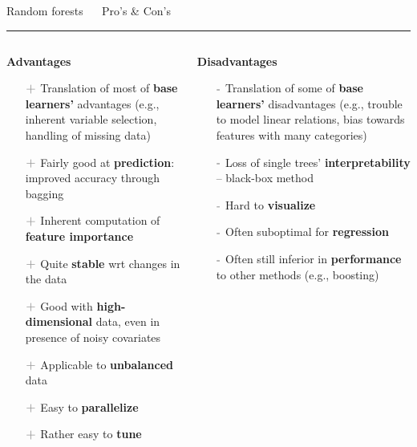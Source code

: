 \documentclass[11pt,compress,t,notes=noshow, xcolor=table]{beamer}
\begin{document}
\LARGE
\begin{frame}{\textcolor{gray!80}{Random forests} ~~ Pro's \& Con's}
\normalsize
\vspace{-0.5cm}
\noindent \textcolor{gray!80}{\rule{\textwidth}{1pt}}

\vspace{0.3cm}

\footnotesize

\begin{columns}[onlytextwidth]
  \begin{column}{0.5\textwidth}
    \textbf{\textcolor{gray!80}{Advantages}}
    \footnotesize
    \begin{itemize}
      \item[$\textbf{\textcolor{gray!80}{+}}$] Translation of most of 
      \textbf{base learners'} advantages (e.g., inherent variable selection, 
      handling of missing data)
      \item[$\textbf{\textcolor{gray!80}{+}}$] Fairly good at 
      \textbf{prediction}: improved accuracy through bagging
      \item[$\textbf{\textcolor{gray!80}{+}}$] Inherent computation of 
      \textbf{feature importance}
      \item[$\textbf{\textcolor{gray!80}{+}}$] Quite \textbf{stable} wrt changes 
      in the data
      \item[$\textbf{\textcolor{gray!80}{+}}$] Good with 
      \textbf{high-dimensional} data, even in presence of noisy covariates
      \item[$\textbf{\textcolor{gray!80}{+}}$] Applicable to \textbf{unbalanced} 
      data
      \item[$\textbf{\textcolor{gray!80}{+}}$] Easy to \textbf{parallelize}
      \item[$\textbf{\textcolor{gray!80}{+}}$] Rather easy to \textbf{tune}
    \end{itemize}
  \end{column}
  \begin{column}{0.5\textwidth}
    \textbf{\textcolor{gray!80}{Disadvantages}}
    \footnotesize
    \begin{itemize}
      \item[$\textbf{\textcolor{gray!80}{-}}$] Translation of some of 
      \textbf{base learners'} disadvantages (e.g., trouble to model linear
      relations, bias towards features with many categories)
      \item[$\textbf{\textcolor{gray!80}{-}}$] Loss of single trees' 
      \textbf{interpretability} -- black-box method
      \item[$\textbf{\textcolor{gray!80}{-}}$] Hard to \textbf{visualize}
      \item[$\textbf{\textcolor{gray!80}{-}}$] Often suboptimal for 
      \textbf{regression}
      \item[$\textbf{\textcolor{gray!80}{-}}$] Often still inferior in
      \textbf{performance} to other methods (e.g., boosting)
    \end{itemize}
  \end{column}
\end{columns}


\end{frame}
\end{document}
